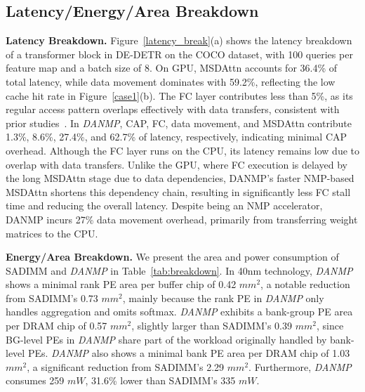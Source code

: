 \documentclass[sigconf]{acmart}
\begin{document}
\subsection{{Latency/}Energy/Area Breakdown}
\label{lea_break}
{\bf Latency Breakdown.} Figure~\ref{latency_break}(a) shows the latency breakdown of a transformer block in DE-DETR on the COCO dataset, with 100 queries per feature map and a batch size of 8. On GPU, MSDAttn accounts for 36.4\% of total latency, while data movement dominates with 59.2\%, reflecting the low cache hit rate in Figure~\ref{case1}(b). The FC layer contributes less than 5\%, as its regular access pattern overlaps effectively with data transfers, consistent with prior studies~\cite{kao2023flat, gilbert2024looptree, lee2024infinigen}. {In \textit{DANMP}, CAP, FC, data movement, and MSDAttn contribute 1.3\%, 8.6\%, 27.4\%, and 62.7\% of latency, respectively, indicating minimal CAP overhead.} Although the FC layer runs on the CPU, its latency remains low due to overlap with data transfers. {Unlike the GPU, where FC execution is delayed by the long MSDAttn stage due to data dependencies, DANMP’s faster NMP-based MSDAttn shortens this dependency chain, resulting in significantly less FC stall time and reducing the overall latency.} Despite being an NMP accelerator, DANMP incurs 27\% data movement overhead, primarily from transferring weight matrices to the CPU.


{\bf Energy/Area Breakdown.} We present the area and power consumption of SADIMM and \textit{DANMP} in Table~\ref{tab:breakdown}. {In 40nm technology, \textit{DANMP} shows a minimal rank PE area per buffer chip of 0.42 $mm^2$, a notable reduction from SADIMM’s 0.73 $mm^2$, mainly because the rank PE in \textit{DANMP} only handles aggregation and omits softmax. \textit{DANMP} exhibits a bank-group PE area per DRAM chip of 0.57 $mm^2$, slightly larger than SADIMM’s 0.39 $mm^2$, since BG-level PEs in \textit{DANMP} share part of the workload originally handled by bank-level PEs. \textit{DANMP} also shows a minimal bank PE area per DRAM chip of 1.03 $mm^2$, a significant reduction from SADIMM’s 2.29 $mm^2$. Furthermore, \textit{DANMP} consumes 259 $mW$, 31.6\% lower than SADIMM’s 335 $mW$.}
\end{document}
